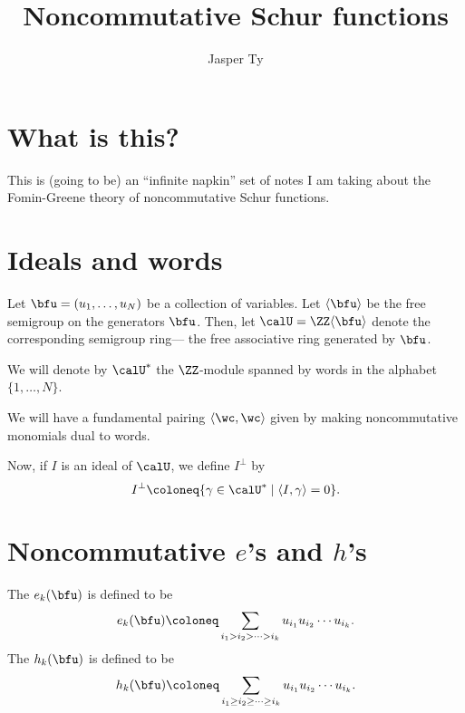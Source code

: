 \documentclass{article}
\title{Noncommutative Schur functions}
\author{Jasper Ty}
\date{}
\newcommand{\ip}[1]{
    \left\langle
        {#1}
    \right\rangle
}
\begin{document}
\maketitle

\section*{What is this?}

This is (going to be) an ``infinite napkin'' set of notes I am taking about the Fomin-Greene theory of noncommutative Schur functions.

\tableofcontents

\newpage

\section{Ideals and words}

Let $\bfu = (u_1,\ldots,u_N)$ be a collection of variables.
Let $\langle \bfu \rangle$ be the free semigroup on the generators $\bfu$.
Then, let $\calU = \ZZ\langle\bfu\rangle$ denote the corresponding semigroup ring--- the free associative ring generated by $\bfu$.

We will denote by $\calU^\ast$ the $\ZZ$-module spanned by words in the alphabet $\{1,\ldots,N\}$.

We will have a fundamental pairing $\ip{\wc,\wc}$ given by making noncommutative monomials dual to words.

Now, if $I$ is an ideal of $\calU$, we define $I^\perp$ by
\[
    I^\perp
    \coloneq
    \{
        \gamma \in \calU^\ast
        \mid
        \ip{I, \gamma} = 0
    \}.
\]

\section{
    Noncommutative 
    \texorpdfstring{$e$}{e}'s
    and
    \texorpdfstring{$h$}{h}'s
}

\begin{definition}
    The  $e_k(\bfu)$ is defined to be
    \[
        e_k(\bfu)
        \coloneq
        \sum_{i_1 > i_2 > \cdots > i_k}
        u_{i_1} u_{i_2} \cdots u_{i_k}. 
    \]
    The  $h_k(\bfu)$ is defined to be
    \[
        h_k(\bfu)
        \coloneq
        \sum_{i_1 \geq i_2 \geq \cdots \geq i_k}
        u_{i_1} u_{i_2} \cdots u_{i_k}. 
    \]
\end{definition}
\end{document}
